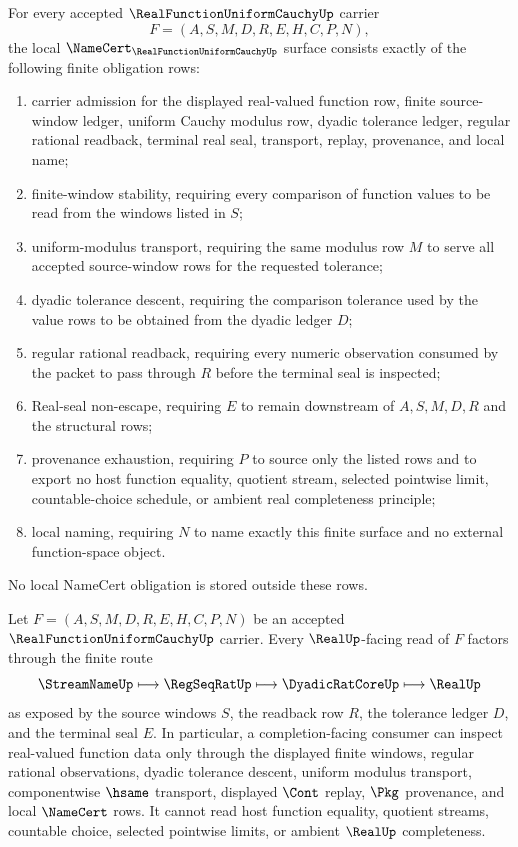 \begin{theorem}\label{thm:real-function-uniform-cauchy-namecert-obligations}
For every accepted $\RealFunctionUniformCauchyUp$ carrier
$$
F=(A,S,M,D,R,E,H,C,P,N),
$$
the local $\NameCert_{\RealFunctionUniformCauchyUp}$ surface consists exactly of the following finite obligation rows:
\begin{enumerate}
\item carrier admission for the displayed real-valued function row, finite source-window ledger, uniform Cauchy modulus row, dyadic tolerance ledger, regular rational readback, terminal real seal, transport, replay, provenance, and local name;
\item finite-window stability, requiring every comparison of function values to be read from the windows listed in $S$;
\item uniform-modulus transport, requiring the same modulus row $M$ to serve all accepted source-window rows for the requested tolerance;
\item dyadic tolerance descent, requiring the comparison tolerance used by the value rows to be obtained from the dyadic ledger $D$;
\item regular rational readback, requiring every numeric observation consumed by the packet to pass through $R$ before the terminal seal is inspected;
\item Real-seal non-escape, requiring $E$ to remain downstream of $A,S,M,D,R$ and the structural rows;
\item provenance exhaustion, requiring $P$ to source only the listed rows and to export no host function equality, quotient stream, selected pointwise limit, countable-choice schedule, or ambient real completeness principle;
\item local naming, requiring $N$ to name exactly this finite surface and no external function-space object.
\end{enumerate}
No local NameCert obligation is stored outside these rows.
\end{theorem}

\begin{theorem}\label{thm:real-function-uniform-cauchy-real-completion-handoff}
Let $F=(A,S,M,D,R,E,H,C,P,N)$ be an accepted $\RealFunctionUniformCauchyUp$ carrier. Every $\RealUp$-facing read of $F$ factors through the finite route
$$
\StreamNameUp \longmapsto \RegSeqRatUp \longmapsto \DyadicRatCoreUp \longmapsto \RealUp
$$
as exposed by the source windows $S$, the readback row $R$, the tolerance ledger $D$, and the terminal seal $E$. In particular, a completion-facing consumer can inspect real-valued function data only through the displayed finite windows, regular rational observations, dyadic tolerance descent, uniform modulus transport, componentwise $\hsame$ transport, displayed $\Cont$ replay, $\Pkg$ provenance, and local $\NameCert$ rows. It cannot read host function equality, quotient streams, countable choice, selected pointwise limits, or ambient $\RealUp$ completeness.
\end{theorem}

